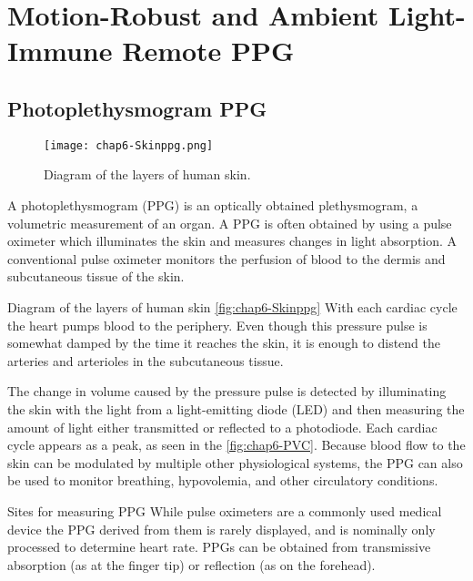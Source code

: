 \chapter{Motion-Robust and Ambient Light-Immune Remote PPG} %

\label{Chapter6} %


\section {Photoplethysmogram PPG}\cite{wiki-PPG}
\begin{figure}[hb]
  \centering
    \texttt{[image: chap6-Skinppg.png]}
  \caption{Diagram of the layers of human skin.}
  \label{fig:chap6-Skinppg}
\end{figure}

A photoplethysmogram (PPG) is an optically obtained plethysmogram, a volumetric measurement of an organ.
A PPG is often obtained by using a pulse oximeter which illuminates the skin and measures changes in light absorption.
A conventional pulse oximeter monitors the perfusion of blood to the dermis and subcutaneous tissue of the skin.

Diagram of the layers of human skin \autoref{fig:chap6-Skinppg} With each cardiac cycle the heart pumps
blood to the periphery. Even though this pressure pulse is somewhat damped
by the time it reaches the skin, it is enough to distend the arteries and
arterioles in the subcutaneous tissue.

The change in volume caused by the pressure pulse is detected by illuminating the skin
with the light from a light-emitting diode (LED) and then measuring the amount of
light either transmitted or reflected to a photodiode.
Each cardiac cycle appears as a peak, as seen in the \autoref{fig:chap6-PVC}.
Because blood flow to the skin can be modulated by multiple other physiological systems,
the PPG can also be used to monitor breathing, hypovolemia,
and other circulatory conditions.

Sites for measuring PPG
While pulse oximeters are a commonly used medical device the PPG derived from them is
rarely displayed, and is nominally only processed to determine heart rate.
PPGs can be obtained from transmissive absorption (as at the finger tip) or
reflection (as on the forehead).

